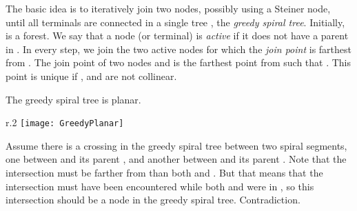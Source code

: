 \documentclass{journalA4}
\begin{document}
The basic idea is to iteratively join two nodes, possibly using a Steiner node, until all terminals are connected in a single tree , the \emph{greedy spiral tree}. Initially,
 is a forest. We say that a node (or terminal) is \emph{active} if it does not have a parent in . In every step, we join the two active nodes for which the \emph{join point}
is farthest from . The join point  of two nodes  and  is the farthest point  from  such that . This point is unique if ,  and  are not collinear.

\clearpage 
\begin{lemma}
\label{lem:greedyplanar} The greedy spiral tree is planar.
\end{lemma}

\begin{wrapfigure}[6]{r}{.2\textwidth}
  \centering
  \texttt{[image: GreedyPlanar]}
\end{wrapfigure}
 Assume there is a crossing in the greedy spiral tree between two spiral segments, one between  and its parent , and another between  and its
parent . Note that the intersection must be farther from  than both  and . But that means that the intersection must have been
encountered while both  and  were in , so this intersection should be a node in the greedy spiral tree. Contradiction.\hfill\QED
\medskip
\end{document}
